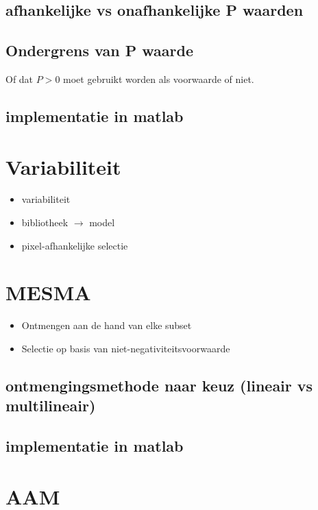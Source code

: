 \documentclass[12pt]{report}
\begin{document}
\subsection{afhankelijke vs onafhankelijke P waarden}

\subsection{Ondergrens van P waarde}

Of dat $P > 0$ moet gebruikt worden als voorwaarde of niet.

\subsection{implementatie in matlab}



\section{Variabiliteit}

\begin{itemize}
\item variabiliteit
\item bibliotheek $\rightarrow$ model
\item pixel-afhankelijke selectie
\end{itemize}

\section{MESMA}

\begin{itemize}
\item Ontmengen aan de hand van elke subset
\item Selectie op basis van niet-negativiteitsvoorwaarde
\end{itemize}

\subsection{ontmengingsmethode naar keuz (lineair vs multilineair)}

\subsection{implementatie in matlab}

\section{AAM}
\end{document}
